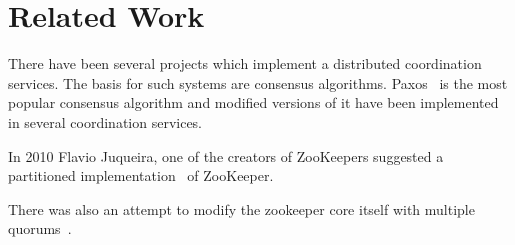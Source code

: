 \chapter{Related Work}

There have been several projects which implement a distributed coordination services. The basis for such systems are consensus algorithms. Paxos~\cite{lamport2001paxos} is the most popular consensus algorithm and modified versions of it have been implemented in several coordination services.

In 2010 Flavio Juqueira, one of the creators of ZooKeepers suggested a partitioned implementation~\cite{junqueira2010partitioned} of ZooKeeper.

There was also an attempt to modify the zookeeper core itself with multiple quorums~\cite{biligiri2014multiquorum}.
